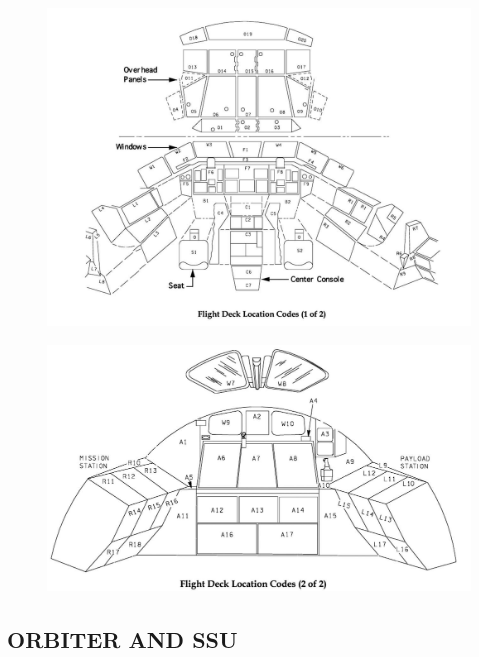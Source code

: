 \documentclass[13pt]{article}
\begin{document}
\newpage
\begin{figure}[H]
  \centering
  \includegraphics[width=\textwidth,height=0.6\textheight,keepaspectratio]{Flight_Deck_Loc_Codes_1.jpg}
  \caption{}
  \label{fig:FlightDeckLocCodes1}
\end{figure}
\begin{figure}[H]
  \centering
  \includegraphics[width=\textwidth,height=0.35\textheight,keepaspectratio]{Flight_Deck_Loc_Codes_2.jpg}
  \caption{}
  \label{fig:FlightDeckLocCodes2}
\end{figure}

\newpage
\subsection{ORBITER AND SSU}
\renewcommand{\cfttoctitlefont}{\bf}
\localtableofcontents
\end{document}
